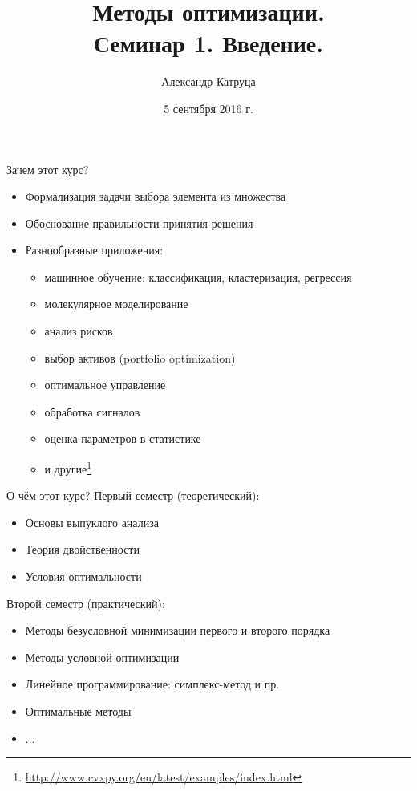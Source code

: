 \documentclass[12pt]{beamer}
\title[Семинар 1]{Методы оптимизации. \\
Семинар 1. Введение.}
\author{Александр Катруца}
\institute{Московский физико-технический институт,\\
Факультет Управления и Прикладной Математики}
\date{5 сентября 2016 г.}
\begin{document}
\begin{frame}
\titlepage
\end{frame}

\begin{frame}{Зачем этот курс?}
\begin{itemize}
\item Формализация задачи выбора элемента из множества
\item Обоснование правильности принятия решения
\item Разнообразные приложения:
\begin{itemize}
\item машинное обучение: классификация, кластеризация, регрессия
\item молекулярное моделирование
\item анализ рисков
\item выбор активов (portfolio optimization)
\item оптимальное управление
\item обработка сигналов
\item оценка параметров в статистике 
\item и другие\footnote{\url{http://www.cvxpy.org/en/latest/examples/index.html}}
\end{itemize}
\end{itemize}
\end{frame}

\begin{frame}{О чём этот курс?}
Первый семестр (теоретический):
\begin{itemize}
\item Основы выпуклого анализа
\item Теория двойственности
\item Условия оптимальности
\end{itemize}

Второй семестр (практический):
\begin{itemize}
\item Методы безусловной минимизации первого и второго порядка 
\item Методы условной оптимизации
\item Линейное программирование: симплекс-метод и пр.
\item Оптимальные методы
\item ...
\end{itemize}
\end{frame}
\end{document}
